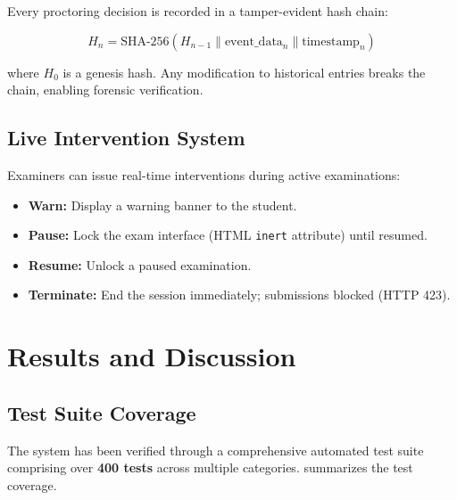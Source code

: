 \documentclass{article}
\begin{document}
Every proctoring decision is recorded in a tamper-evident hash chain:

\begin{equation}
    H_n = \text{SHA-256}(H_{n-1} \| \text{event\_data}_n \| \text{timestamp}_n)
    \label{eq:audit_chain}
\end{equation}

where $H_0$ is a genesis hash. Any modification to historical entries breaks the chain, enabling forensic verification.

\subsection{Live Intervention System}

Examiners can issue real-time interventions during active examinations:

\begin{itemize}
    \item \textbf{Warn:} Display a warning banner to the student.
    \item \textbf{Pause:} Lock the exam interface (HTML \texttt{inert} attribute) until resumed.
    \item \textbf{Resume:} Unlock a paused examination.
    \item \textbf{Terminate:} End the session immediately; submissions blocked (HTTP 423).
\end{itemize}

\section{Results and Discussion}
\label{sec:results}

\subsection{Test Suite Coverage}

The system has been verified through a comprehensive automated test suite comprising over \textbf{400 tests} across multiple categories.  summarizes the test coverage.
\end{document}
